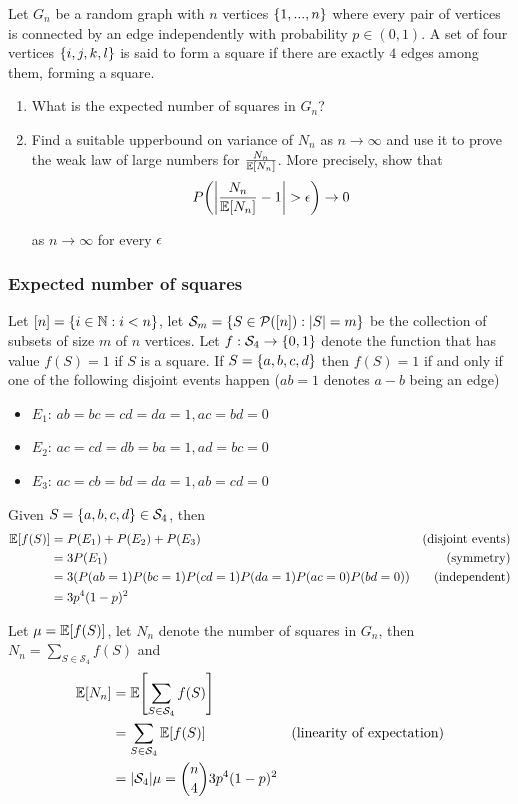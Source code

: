 \documentclass{article}
\begin{document}
Let $G_n$ be a random graph with $n$ vertices $\{1, ..., n\}$ where every pair of vertices is connected by an edge independently with probability $p \in (0, 1)$. A set of four vertices $\{i, j, k, l\}$ is said to form a square if there are exactly $4$ edges among them, forming a square.
\begin{enumerate}
    \item What is the expected number of squares in $G_n$?
    \item Find a suitable upperbound on variance of $N_n$ as $n \to \infty$ and use it to prove the weak law of large numbers for $\frac{N_n}{\mathbb{E}[N_n]}$. More precisely, show that
    $$
        P\tuple*{\abs*{\frac{N_n}{\Exp[N_n]} - 1} > \eps} \to 0
    $$

    as $n \to \infty$ for every $\epsilon$
\end{enumerate}

\subsubsection{Expected number of squares}
    
Let $[n] = \{i \in \mathbb{N}: i < n\}$, let $\mathcal{S}_m = \{S \in \mathcal{P}([n]): |S| = m\}$ be the collection of subsets of size $m$ of $n$ vertices. Let $f: \mathcal{S}_4 \to \{0, 1\}$ denote the function that has value $f(S) = 1$ if $S$ is a square. If $S = \{a, b, c, d\}$ then $f(S) = 1$ if and only if one of the following disjoint events happen ($ab=1$ denotes $a-b$ being an edge)
\begin{itemize}
    \item $E_1$: $ab=bc=cd=da=1, ac=bd=0$
    \item $E_2$: $ac=cd=db=ba=1, ad=bc=0$
    \item $E_3$: $ac=cb=bd=da=1, ab=cd=0$
\end{itemize}

Given $S = \{a, b, c, d\} \in \mathcal{S}_4$, then 
\begin{align*}
    \mathbb{E}[f(S)]
    &= P(E_1) + P(E_2) + P(E_3) &\text{(disjoint events)}\\
    &= 3 P(E_1) &\text{(symmetry)} \\
    &= 3 (P(ab=1) P(bc=1) P(cd=1) P(da=1) P(ac=0) P(bd=0)) &\text{(independent)} \\
    &= 3 p^4 (1-p)^2
\end{align*}

Let $\mu = \mathbb{E}[f(S)]$, let $N_n$ denote the number of squares in $G_n$, then $N_n = \sum_{S \in \mathcal{S}_4} f(S)$ and
\begin{align*}
    \Exp[N_n]
    &= \Exp\bracket*{\sum_{S \in \mathcal{S}_4} f(S)} \\
    &= \sum_{S \in \mathcal{S}_4} \Exp[f(S)] &\text{(linearity of expectation)} \\
    &= |\mathcal{S}_4| \mu = {n \choose 4} 3 p^4 (1-p)^2
\end{align*}
    
\end{document}

